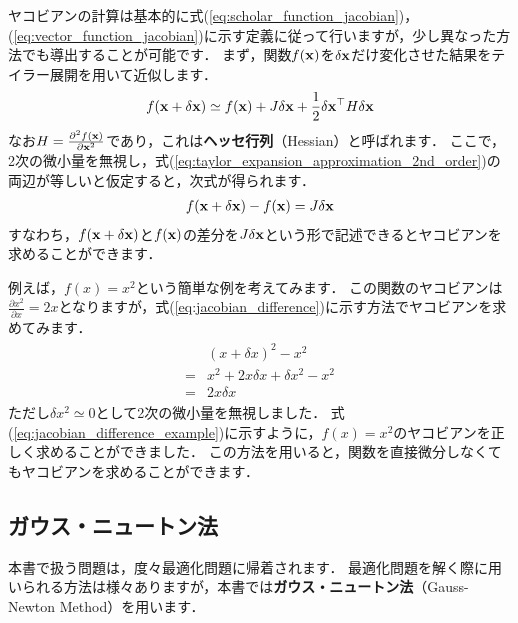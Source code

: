 ヤコビアンの計算は基本的に式(\ref{eq:scholar_function_jacobian})，(\ref{eq:vector_function_jacobian})に示す定義に従って行いますが，少し異なった方法でも導出することが可能です．
まず，関数$f({\bf x})$を$\delta {\bf x}$だけ変化させた結果をテイラー展開を用いて近似します．
%
\begin{align}
  f({\bf x} + \delta {\bf x}) \simeq
  f({\bf x}) + 
  J \delta {\bf x} + 
  \frac{1}{2} \delta {\bf x}^{\top} H \delta {\bf x}
  \label{eq:taylor_expansion_approximation_2nd_order}
\end{align}
%
なお$H = \frac{ \partial^{2} f({\bf x}) }{ \partial {\bf x}^{2} }$であり，これは{\bf ヘッセ行列}（Hessian）と呼ばれます．
ここで，2次の微小量を無視し，式(\ref{eq:taylor_expansion_approximation_2nd_order})の両辺が等しいと仮定すると，次式が得られます．
%
\begin{align}
  f({\bf x} + \delta {\bf x}) - f({\bf x}) = J \delta {\bf x}
  \label{eq:jacobian_difference}
\end{align}
%
すなわち，$f({\bf x} + \delta {\bf x})$と$f({\bf x})$の差分を$J \delta {\bf x}$という形で記述できるとヤコビアンを求めることができます．

例えば，$f(x) = x^{2}$という簡単な例を考えてみます．
この関数のヤコビアンは$\frac{ \partial x^{2} }{ \partial x } = 2x$となりますが，式(\ref{eq:jacobian_difference})に示す方法でヤコビアンを求めてみます．
%
\begin{align}
  \begin{split}
    & (x + \delta x)^{2} - x^{2} \\
    = & x^{2} + 2 x \delta x + \delta x^{2} - x^{2} \\
    = & 2 x \delta x
  \end{split}
  \label{eq:jacobian_difference_example}
\end{align}
%
ただし$\delta x^{2} \simeq 0$として2次の微小量を無視しました．
式(\ref{eq:jacobian_difference_example})に示すように，$f(x) = x^{2}$のヤコビアンを正しく求めることができました．
この方法を用いると，関数を直接微分しなくてもヤコビアンを求めることができます．

\subsection{ガウス・ニュートン法}

本書で扱う問題は，度々最適化問題に帰着されます．
最適化問題を解く際に用いられる方法は様々ありますが，本書では{\bf ガウス・ニュートン法}（Gauss-Newton Method）を用います．

